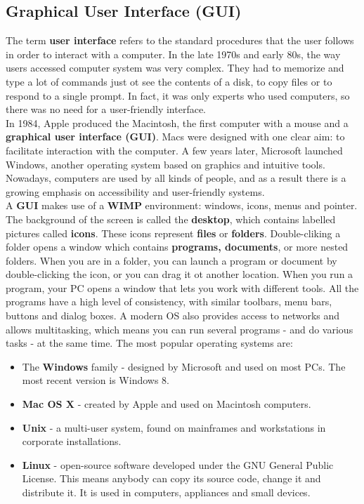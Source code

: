 \documentclass[a4paper,8pt]{article}
\begin{document}
\subsection{Graphical User Interface (GUI)}
The term \textbf{user interface} refers to the standard procedures that the user
follows in order to interact with a computer. In the late 1970s and early 80s,
the way users accessed computer system was very complex. They had to memorize
and type a lot of commands just ot see the contents of a disk, to copy files
or to respond to a single prompt. In fact, it was only experts who used 
computers, so there was no need for a user-friendly interface.\\
In 1984, Apple produced the Macintosh, the first computer with a mouse and a
\textbf{graphical user interface (GUI)}. Macs were designed with one clear aim:
to facilitate interaction with the computer. A few years later, Microsoft 
launched Windows, another operating system based on graphics and intuitive
tools. Nowadays, computers are used by all kinds of people, and as a result
there is a growing emphasis on accessibility and user-friendly systems.\\
A \textbf{GUI} makes use of a \textbf{WIMP} environment: windows, icons, menus
and pointer. The background of the screen is called the \textbf{desktop}, which 
contains labelled pictures called \textbf{icons}. These icons represent
\textbf{files} or \textbf{folders}. Double-cliking a folder opens a window
which contains \textbf{programs, documents}, or more nested folders. When
you are in a folder, you can launch a program or document by double-clicking 
the icon, or you can drag it ot another location. When you run a program, 
your PC opens a window that lets you work with different tools.
All the programs have a high level of consistency, with similar toolbars,
menu bars, buttons and dialog boxes. A modern OS also provides access to 
networks and allows multitasking, which means you can run several programs - 
and do various tasks - at the same time.
The most popular operating systems are:
\begin{itemize}
\item The \textbf{Windows} family - designed by Microsoft and used on most PCs.
  The most recent version is Windows 8.
\item \textbf{Mac OS X} - created by Apple and used on Macintosh computers.
\item \textbf{Unix} - a multi-user system, found on mainframes and workstations
  in corporate installations.
\item \textbf{Linux} - open-source software developed under the GNU General
  Public License. This means anybody can copy its source code, change it and
  distribute it. It is used in computers, appliances and small devices.
\end{itemize}
\end{document}
